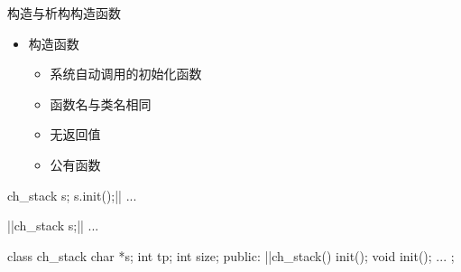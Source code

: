 \begin{frame}[t, fragile]{构造与析构}{构造函数}%
  \begin{spacing}{1.2}
    \begin{itemize}
    \item 构造函数
      \begin{itemize}
      \item 系统自动调用的初始化函数
      \item 函数名与类名相同
      \item 无返回值
      \item 公有函数
      \end{itemize}
    \end{itemize}
  \end{spacing}
  \begin{center}
  \begin{minipage}[b]{0.2\linewidth}
    \begin{cpptt}
ch_stack s;
s.init();||
...
    \end{cpptt}
  \end{minipage}\qquad
  \begin{minipage}[b]{0.2\linewidth}
    \begin{cpptt}
||ch_stack s;||
...
    \end{cpptt}
  \end{minipage}\qquad
  \begin{minipage}{0.3\linewidth}
    \begin{cpptt}
class ch_stack
{
    char *s;
    int tp;
    int size;
public:
    ||ch_stack()
    {
        init();
    }
    void  init();
    ...
};
    \end{cpptt}
  \end{minipage}
  \end{center}
\end{frame}

